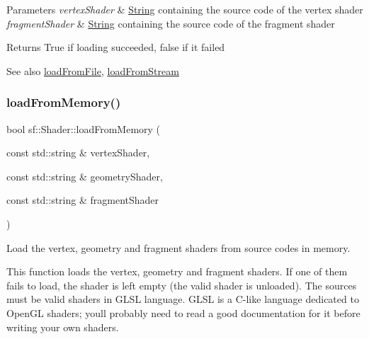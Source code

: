 \begin{DoxyParams}{Parameters}
{\em vertex\+Shader} & \hyperlink{classsf_1_1_string}{String} containing the source code of the vertex shader \\
\hline
{\em fragment\+Shader} & \hyperlink{classsf_1_1_string}{String} containing the source code of the fragment shader\\
\hline
\end{DoxyParams}
\begin{DoxyReturn}{Returns}
True if loading succeeded, false if it failed
\end{DoxyReturn}
\begin{DoxySeeAlso}{See also}
\hyperlink{classsf_1_1_shader_a053a5632848ebaca2fcd8ba29abe9e6e}{load\+From\+File}, \hyperlink{classsf_1_1_shader_a2ee1b130c0606e4f8bcdf65c1efc2a53}{load\+From\+Stream} 
\end{DoxySeeAlso}
\mbox{\label{classsf_1_1_shader_ab8c8b715b02aba2cf7c0a0e0c0984250}} 
\subsubsection{\texorpdfstring{load\+From\+Memory()}{loadFromMemory()}\hspace{0.1cm}{\footnotesize\ttfamily [3/3]}}
{\footnotesize\ttfamily bool sf\+::\+Shader\+::load\+From\+Memory (\begin{DoxyParamCaption}\item[{const std\+::string \&}]{vertex\+Shader,  }\item[{const std\+::string \&}]{geometry\+Shader,  }\item[{const std\+::string \&}]{fragment\+Shader }\end{DoxyParamCaption})}



Load the vertex, geometry and fragment shaders from source codes in memory. 

This function loads the vertex, geometry and fragment shaders. If one of them fails to load, the shader is left empty (the valid shader is unloaded). The sources must be valid shaders in G\+L\+SL language. G\+L\+SL is a C-\/like language dedicated to Open\+GL shaders; you\textquotesingle{}ll probably need to read a good documentation for it before writing your own shaders.


